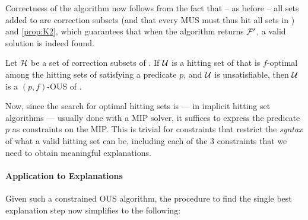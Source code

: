 Correctness of the algorithm now follows from the fact that -- as before -- all sets added to \setstohit are correction subsets (and that every MUS must thus hit all sets in \setstohit) and \cref{prop:K2}, which guarantees that when the algorithm returns $\mathcal{F} '$, a valid solution is indeed found. 
 
\begin{proposition}\label{prop:K2}
  Let $\mathcal{H}$ be a set of correction subsets of \mcses{\formula}. 
  If $\mathcal{U}$ is a hitting set of  that is $f$-optimal among the hitting sets of  satisfying a predicate $p$, and  $\mathcal{U}$ is unsatisfiable, then $\mathcal{U}$ is a $(p,f)$-OUS of \formula. 
\end{proposition}

Now, since the search for optimal hitting sets is --- in implicit hitting set algorithms --- usually done with a MIP solver, it suffices to express the predicate $p$ as constraints on the MIP. This is trivial for constraints that restrict the \textit{syntax} of what a valid hitting set can be, including each of the 3 constraints that we need to obtain meaningful explanations. %

\paragraph{Application to Explanations}

Given such a constrained OUS algorithm, the procedure to find the single best explanation step now simplifies to the following:


